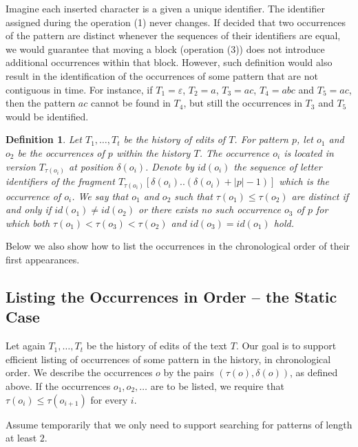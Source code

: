 \documentclass[a4paper]{article}
\newtheorem{definition}[theorem]{Definition}
\theoremstyle{remark}
\newcommand{\eps}{\varepsilon}
\begin{document}
Imagine each inserted character is a given a unique identifier.
The identifier assigned during the operation (1) never changes.
If decided that two occurrences of the pattern are distinct
whenever the sequences of their identifiers are equal,
we would guarantee that moving a block (operation (3)) does
not introduce additional occurrences within that block.
However, such definition would also result in the identification
of the occurrences of some pattern that are not contiguous
in time.
For instance, if $T_1=\eps$, $T_2=a$, $T_3=ac$, $T_4=abc$ and $T_5=ac$,
then the pattern $ac$ cannot be found in $T_4$, but still the
occurrences in $T_3$ and $T_5$ would be identified.

\begin{definition}
Let $T_1,\ldots,T_t$ be the history of edits of $T$.
For pattern $p$, let $o_1$ and $o_2$
be the occurrences
of $p$ within the history $T$.
The occurrence $o_i$ is located in version $T_{\tau(o_i)}$ at position $\delta(o_i)$.
Denote by $id(o_i)$ the sequence of letter identifiers of the fragment $T_{\tau(o_i)}[\delta(o_i)..(\delta(o_i)+|p|-1)]$
which is the occurrence of $o_i$.
We say that $o_1$ and $o_2$ such that $\tau(o_1)\leq \tau(o_2)$ are distinct if and only if
$id(o_1)\neq id(o_2)$ or there exists no such occurrence $o_3$ of $p$ for which both
$\tau(o_1)<\tau(o_3)<\tau(o_2)$ and $id(o_3)=id(o_1)$ hold.
\end{definition}



Below we also show how to list the occurrences
in the chronological order of their first appearances.

\subsection{Listing the Occurrences in Order -- the Static Case}\label{sec:timelinestatic}

Let again $T_1,\ldots,T_t$ be the history of edits of the text $T$.
Our goal is to support efficient listing of occurrences of some pattern
in the history, in chronological order.
We describe the occurrences $o$ by the pairs $(\tau(o),\delta(o))$, as defined above.
If the occurrences $o_1,o_2,\ldots$ are to be listed, we require that
$\tau(o_i)\leq \tau(o_{i+1})$ for every $i$.

Assume temporarily that we only need to support searching for patterns
of length at least $2$.
\end{document}
